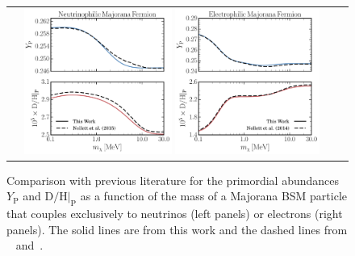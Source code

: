 \begin{figure}[t]
    \begin{center}
    \begin{tabular}{cc}
     \hspace{-0.5cm} \includegraphics[width=0.46\textwidth]{figures/NollettNU.pdf}  \hspace{0.4cm} \includegraphics[width=0.45\textwidth]{figures/NollettEE.pdf}
      \end{tabular}
      \end{center}\vspace{-0.8cm}
    \caption{Comparison with previous literature for the primordial abundances $Y_{\mathrm{P}}$ and $\mathrm{D}/\mathrm{H}|_{\mathrm{P}}$ as a function of the mass of a Majorana BSM particle that couples exclusively to neutrinos (left panels) or electrons (right panels). The solid lines are from this work and the dashed lines from ~\cite{Nollett:2013pwa} and~\cite{Nollett:2014lwa}.}
    \label{fig:mccabe}
    \vspace{-0.5cm}
\end{figure}

